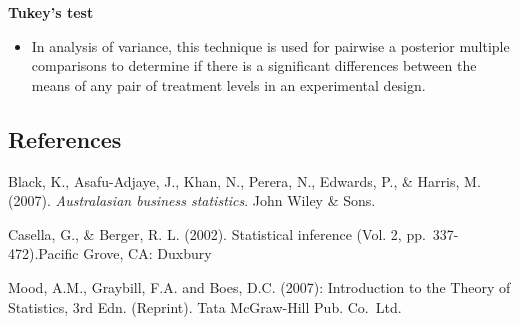 \documentclass[]{book}
\providecommand{\tightlist}{%
  \setlength{\itemsep}{0pt}\setlength{\parskip}{0pt}}
\begin{document}
\textbf{Tukey's test}

\begin{itemize}
\tightlist
\item
  In analysis of variance, this technique is used for pairwise a posterior multiple comparisons to determine if there is a significant differences between the means of any pair of treatment levels in an experimental design.
\end{itemize}

\hypertarget{references-2}{%
\subsection*{References}\label{references-2}}

Black, K., Asafu-Adjaye, J., Khan, N., Perera, N., Edwards, P., \& Harris, M. (2007). \emph{Australasian business statistics}. John Wiley \& Sons.

Casella, G., \& Berger, R. L. (2002). Statistical inference (Vol. 2, pp.~337-472).Pacific Grove, CA: Duxbury

Mood, A.M., Graybill, F.A. and Boes, D.C. (2007): Introduction to the Theory of Statistics, 3rd Edn. (Reprint). Tata McGraw-Hill Pub. Co.~Ltd.


\end{document}
